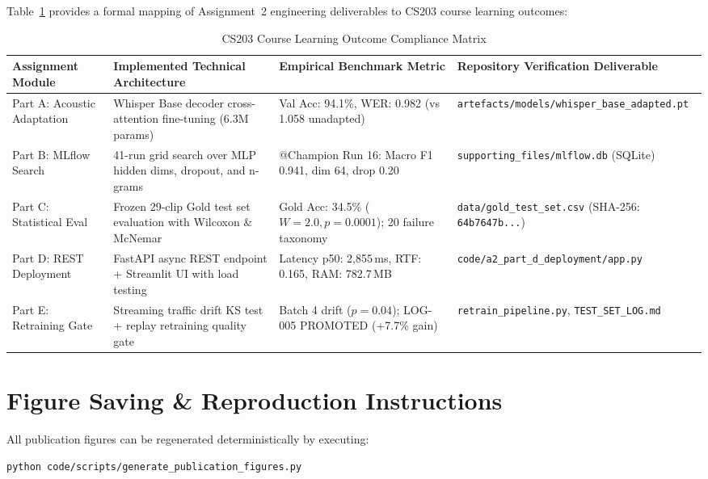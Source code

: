 \documentclass[sigconf,authordraft]{acmart}
\begin{document}
Table~\ref{tab:course_matrix} provides a formal mapping of Assignment~2 engineering deliverables to CS203 course learning outcomes:

\begin{table}[t]
  \caption{CS203 Course Learning Outcome Compliance Matrix}
  \label{tab:course_matrix}
  \centering
  \small
  \begin{tabular}{llll}
    \toprule
    \textbf{Assignment Module} & \textbf{Implemented Technical Architecture} & \textbf{Empirical Benchmark Metric} & \textbf{Repository Verification Deliverable} \\
    \midrule
    Part A: Acoustic Adaptation & Whisper Base decoder cross-attention fine-tuning (6.3M params) & Val Acc: 94.1\%, WER: 0.982 (vs 1.058 unadapted) & \texttt{artefacts/models/whisper\_base\_adapted.pt} \\
    Part B: MLflow Search & 41-run grid search over MLP hidden dims, dropout, and n-grams & @Champion Run 16: Macro F1 0.941, dim 64, drop 0.20 & \texttt{supporting\_files/mlflow.db} (SQLite) \\
    Part C: Statistical Eval & Frozen 29-clip Gold test set evaluation with Wilcoxon \& McNemar & Gold Acc: 34.5\% ($W = 2.0, p = 0.0001$); 20 failure taxonomy & \texttt{data/gold\_test\_set.csv} (SHA-256: \texttt{64b7647b...}) \\
    Part D: REST Deployment & FastAPI async REST endpoint + Streamlit UI with load testing & Latency p50: 2,855\,ms, RTF: 0.165, RAM: 782.7\,MB & \texttt{code/a2\_part\_d\_deployment/app.py} \\
    Part E: Retraining Gate & Streaming traffic drift KS test + replay retraining quality gate & Batch 4 drift ($p = 0.04$); LOG-005 PROMOTED (+7.7\% gain) & \texttt{retrain\_pipeline.py}, \texttt{TEST\_SET\_LOG.md} \\
    \bottomrule
  \end{tabular}
\end{table}

\section{Figure Saving & Reproduction Instructions}
\label{app:savefig}

All publication figures can be regenerated deterministically by executing:

\begin{verbatim}
python code/scripts/generate_publication_figures.py
\end{verbatim}
\end{document}
